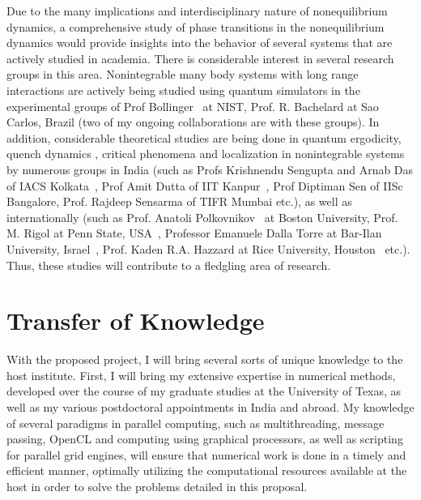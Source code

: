\documentclass[a4paper,11pt,color]{article}
\begin{document}
Due to the many implications and interdisciplinary nature of nonequilibrium dynamics, a comprehensive study of phase transitions in the nonequilibrium dynamics  would provide insights into the behavior of several systems that are actively studied in academia. There is considerable interest in several research groups in this area. Nonintegrable many body systems with long range interactions are actively being studied using quantum simulators in the experimental groups of Prof Bollinger~\cite{bollinger} at NIST, Prof. R. Bachelard at Sao Carlos, Brazil (two of my ongoing collaborations are with these groups). In addition, considerable theoretical studies are being done 
in quantum ergodicity, quench dynamics , critical phenomena and localization in nonintegrable systems by numerous groups in India (such as Profs Krishnendu Sengupta and Arnab Das of IACS Kolkata~\cite{krishrev,freezing}, Prof Amit Dutta of IIT Kanpur~\cite{kitaev}, Prof Diptiman Sen of IISc Bangalore, Prof. Rajdeep Sensarma of TIFR Mumbai etc.), as well as internationally (such as Prof. Anatoli Polkovnikov~\cite{kitaev} at Boston University, Prof. M. Rigol at Penn State, USA~\cite{thermalization}, Professor  Emanuele Dalla Torre at Bar-Ilan University, Israel~\cite{michael}, Prof. Kaden R.A. Hazzard at Rice University, Houston~\cite{michael} etc.). Thus, these studies will contribute to a fledgling area of research. 

\section{Transfer of Knowledge}
With the proposed project, I will bring several sorts of unique knowledge to the host institute. First, I will bring my extensive expertise in numerical methods, developed over the course of my graduate studies at the University of Texas, as well as my various postdoctoral appointments in India and abroad.  My knowledge of several paradigms in parallel computing, such as multithreading, message passing, OpenCL and computing using graphical processors, as well as scripting for parallel grid engines, will ensure that numerical work is done in a timely and efficient manner, optimally utilizing the computational resources available at the host in order to solve the problems detailed in this proposal.
\end{document}
